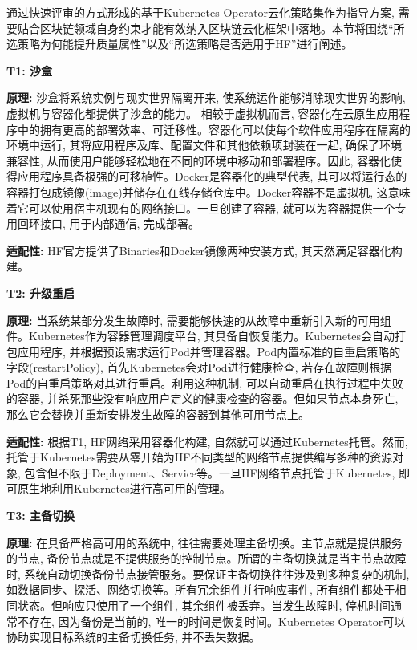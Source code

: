 通过快速评审的方式形成的基于Kubernetes Operator云化策略集作为指导方案, 需要贴合区块链领域自身约束才能有效纳入区块链云化框架中落地。本节将围绕“所选策略为何能提升质量属性”以及“所选策略是否适用于HF”进行阐述。

\textbf{T1: 沙盒}

\textbf{原理: }沙盒将系统实例与现实世界隔离开来, 使系统运作能够消除现实世界的影响, 虚拟机与容器化都提供了沙盒的能力。 相较于虚拟机而言, 容器化在云原生应用程序中的拥有更高的部署效率\cite{zhou2021container}、可迁移性。容器化可以使每个软件应用程序在隔离的环境中运行, 其将应用程序及库、配置文件和其他依赖项封装在一起, 确保了环境兼容性, 从而使用户能够轻松地在不同的环境中移动和部署程序。因此, 容器化使得应用程序具备极强的可移植性。Docker\footnotemark[1]是容器化的典型代表, 其可以将运行态的容器打包成镜像(image)并储存在在线存储仓库中。Docker容器不是虚拟机, 这意味着它可以使用宿主机现有的网络接口\cite{shah2019building}。一旦创建了容器, 就可以为容器提供一个专用回环接口, 用于内部通信, 完成部署。

\textbf{适配性: }HF官方提供了Binaries和Docker镜像两种安装方式\footnotemark[2], 其天然满足容器化构建。

\textbf{T2: 升级重启}

\textbf{原理: }当系统某部分发生故障时, 需要能够快速的从故障中重新引入新的可用组件。Kubernetes作为容器管理调度平台, 其具备自恢复能力。Kubernetes会自动打包应用程序, 并根据预设需求运行Pod并管理容器。Pod内置标准的自重启策略的字段(restartPolicy), 首先Kubernetes会对Pod进行健康检查, 若存在故障则根据Pod的自重启策略对其进行重启。利用这种机制, 可以自动重启在执行过程中失败的容器, 并杀死那些没有响应用户定义的健康检查的容器。但如果节点本身死亡, 那么它会替换并重新安排发生故障的容器到其他可用节点上。

\textbf{适配性: }根据T1, HF网络采用容器化构建, 自然就可以通过Kubernetes托管。然而, 托管于Kubernetes需要从零开始为HF不同类型的网络节点提供编写多种的资源对象, 包含但不限于Deployment、Service等。一旦HF网络节点托管于Kubernetes, 即可原生地利用Kubernetes进行高可用的管理。


\textbf{T3: 主备切换}

\textbf{原理: } 在具备严格高可用的系统中, 往往需要处理主备切换。主节点就是提供服务的节点, 备份节点就是不提供服务的控制节点。所谓的主备切换就是当主节点故障时, 系统自动切换备份节点接管服务。要保证主备切换往往涉及到多种复杂的机制, 如数据同步、探活、网络切换等。所有冗余组件并行响应事件, 所有组件都处于相同状态。但响应只使用了一个组件, 其余组件被丢弃。当发生故障时, 停机时间通常不存在, 因为备份是当前的, 唯一的时间是恢复时间。Kubernetes Operator可以协助实现目标系统的主备切换任务, 并不丢失数据。

